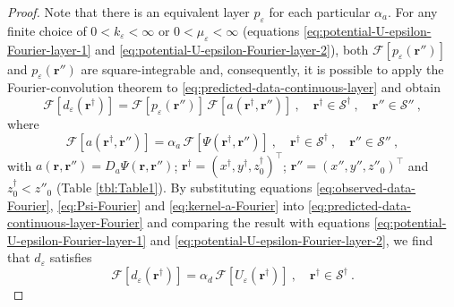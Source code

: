 \documentclass[manuscript,noblind]{geophysics}
\begin{document}
\begin{proof}
		Note that there is an equivalent layer $p_{\varepsilon}$ for each particular $\alpha_{a}$.
		For any finite choice of $0 < k_{\varepsilon} < \infty$ or $0 < \mu_{\varepsilon} < \infty$
		(equations \ref{eq:potential-U-epsilon-Fourier-layer-1} and \ref{eq:potential-U-epsilon-Fourier-layer-2}), 
		both $\mathcal{F} [ p_{\varepsilon}(\mathbf{r}'') ]$ 
		and $p_{\varepsilon}(\mathbf{r}'')$ are square-integrable and, consequently, it is possible to
		apply the Fourier-convolution theorem to \ref{eq:predicted-data-continuous-layer} and obtain
		\begin{equation}
			\mathcal{F} [ d_{\varepsilon}(\mathbf{r}^{\dagger}) ] =
			\mathcal{F} [ p_{\varepsilon}(\mathbf{r}'') ] \, 
			\mathcal{F} [ a(\mathbf{r}^{\dagger}, \mathbf{r}'') ] \: ,
			\quad \mathbf{r}^{\dagger} \in \mathcal{S}^{\dagger} \: ,
			\quad \mathbf{r}'' \in \mathcal{S}'' \: ,
			\label{eq:predicted-data-continuous-layer-Fourier}
		\end{equation}
		where 
		\begin{equation}
			\mathcal{F} [ a(\mathbf{r}^{\dagger}, \mathbf{r}'') ] = \alpha_{a} \, \mathcal{F} [ \Psi(\mathbf{r}^{\dagger}, \mathbf{r}'') ] \: ,
			\quad \mathbf{r}^{\dagger} \in \mathcal{S}^{\dagger} \: ,
			\quad \mathbf{r}'' \in \mathcal{S}'' \: ,
			\label{eq:kernel-a-Fourier}
		\end{equation}
		with $a(\mathbf{r}, \mathbf{r}'') = D_{a} \Psi(\mathbf{r}, \mathbf{r}'')$;
		$\mathbf{r}^{\dagger} = (x^{\dagger}, y^{\dagger}, z^{\dagger}_{0})^{\top}$; 
		$\mathbf{r}'' = (x'', y'', z''_{0})^{\top}$ and $z^{\dagger}_{0} < z''_{0}$ (Table \ref{tbl:Table1}).
		By substituting equations \ref{eq:observed-data-Fourier}, \ref{eq:Psi-Fourier} and \ref{eq:kernel-a-Fourier} 
		into \ref{eq:predicted-data-continuous-layer-Fourier} and comparing the result with equations 
		\ref{eq:potential-U-epsilon-Fourier-layer-1} and \ref{eq:potential-U-epsilon-Fourier-layer-2}, 
		we find that $d_{\varepsilon}$ satisfies
		\begin{equation}
			\mathcal{F} [ d_{\varepsilon}(\mathbf{r}^{\dagger}) ] = 
			\alpha_{d} \,
			\mathcal{F} [ U_{\varepsilon}(\mathbf{r}^{\dagger}) ] \: ,
			\quad \mathbf{r}^{\dagger} \in \mathcal{S}^{\dagger} \: .
			\label{eq:predicted-data-continuous-layer-epsilon-Fourier}
		\end{equation}
		

\end{proof}
\end{document}
